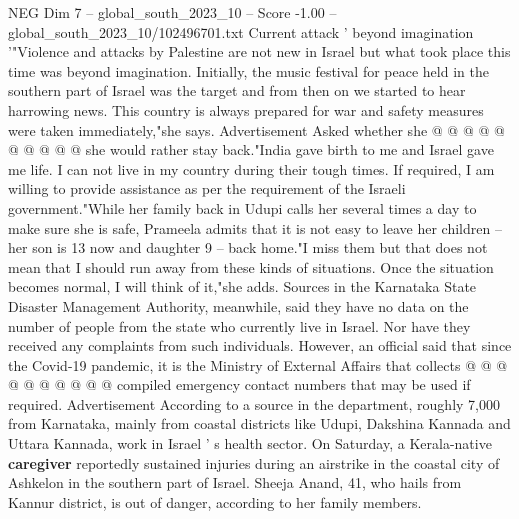 \begin{textsample}{NEG Dim 7 – global\_south\_2023\_10 – Score -1.00 – global\_south\_2023\_10/102496701.txt}
Current attack ' beyond imagination '"Violence and attacks by Palestine are not new in Israel but what took place this time was beyond imagination.
Initially, the music festival for peace held in the southern part of Israel was the target and from then on we started to hear harrowing news.
This country is always prepared for war and safety measures were taken immediately,"she says.
Advertisement Asked whether she @ @ @ @ @ @ @ @ @ @ she would rather stay back."India gave birth to me and Israel gave me life.
I can not live in my country during their tough times.
If required, I am willing to provide assistance as per the requirement of the Israeli government."While her family back in Udupi calls her several times a day to make sure she is safe, Prameela admits that it is not easy to leave her children -- her son is 13 now and daughter 9 -- back home."I miss them but that does not mean that I should run away from these kinds of situations.
Once the situation becomes normal, I will think of it,"she adds.
Sources in the Karnataka State Disaster Management Authority, meanwhile, said they have no data on the number of people from the state who currently live in Israel.
Nor have they received any complaints from such individuals.
However, an official said that since the Covid-19 pandemic, it is the Ministry of External Affairs that collects @ @ @ @ @ @ @ @ @ @ compiled emergency contact numbers that may be used if required.
Advertisement According to a source in the department, roughly 7,000 from Karnataka, mainly from coastal districts like Udupi, Dakshina Kannada and Uttara Kannada, work in Israel ' s health sector.
On Saturday, a Kerala-native \textbf{caregiver} reportedly sustained injuries during an airstrike in the coastal city of Ashkelon in the southern part of Israel.
Sheeja Anand, 41, who hails from Kannur district, is out of danger, according to her family members.

\end{textsample}
